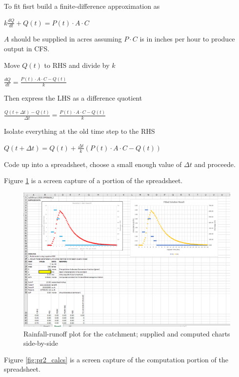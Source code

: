 \documentclass[12pt]{article}
\begin{document}
\begin{enumerate}
To fit fisrt build a finite-difference approximation as

$k\frac{dQ}{dt} + Q(t) = P(t)\cdot A \cdot C$  

$A$ should be supplied in acres assuming $P \cdot C$ is in inches per hour to produce output in CFS.

Move $Q(t)$ to RHS and divide by $k$

$\frac{dQ}{dt}  = \frac{P(t)\cdot A \cdot C-Q(t)}{k}$

Then express the LHS as a difference quotient

$\frac{Q(t+\Delta t) - Q(t)}{\Delta t}  = \frac{P(t)\cdot A \cdot C-Q(t)}{k}$

Isolate everything at the old time step to the RHS

$Q(t+\Delta t)  = Q(t)  + \frac{\Delta t}{k} (P(t)\cdot A \cdot C-Q(t))$

Code up into a spreadsheet, choose a small enough value of $\Delta t$ and proceede.

Figure \ref{fig:pr2_xls} is a screen capture of a portion of the spreadsheet.

\begin{figure}[h!] %
   \centering
   \includegraphics[width=6in]{pr2_xls.png} 
   \caption{Rainfall-runoff plot for the catchment; supplied and computed charts side-by-side}
   \label{fig:pr2_xls}
\end{figure}
\clearpage
Figure \ref{fig:pr2_calcs} is a screen capture of the computation portion of the spreadsheet.


\end{enumerate}
\end{document}
